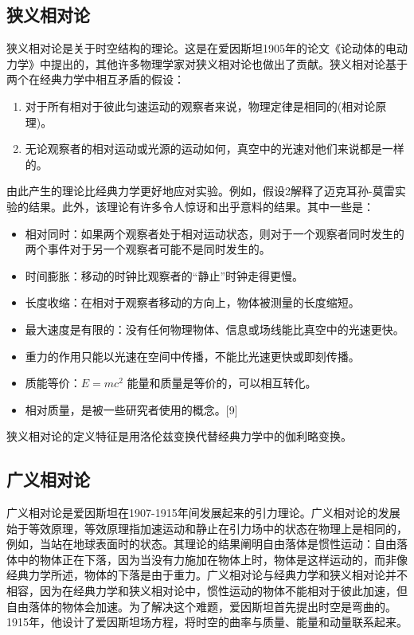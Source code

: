 \subsection{狭义相对论}

狭义相对论是关于时空结构的理论。这是在爱因斯坦1905年的论文《论动体的电动力学》中提出的，其他许多物理学家对狭义相对论也做出了贡献。狭义相对论基于两个在经典力学中相互矛盾的假设：

\begin{enumerate}
\item 对于所有相对于彼此匀速运动的观察者来说，物理定律是相同的(相对论原理)。
\item 无论观察者的相对运动或光源的运动如何，真空中的光速对他们来说都是一样的。
\end{enumerate}

由此产生的理论比经典力学更好地应对实验。例如，假设2解释了迈克耳孙-莫雷实验的结果。此外，该理论有许多令人惊讶和出乎意料的结果。其中一些是：

\begin{itemize}
\item 相对同时：如果两个观察者处于相对运动状态，则对于一个观察者同时发生的两个事件对于另一个观察者可能不是同时发生的。
\item 时间膨胀：移动的时钟比观察者的“静止”时钟走得更慢。
\item 长度收缩：在相对于观察者移动的方向上，物体被测量的长度缩短。
\item 最大速度是有限的：没有任何物理物体、信息或场线能比真空中的光速更快。
\item 重力的作用只能以光速在空间中传播，不能比光速更快或即刻传播。
\item 质能等价：$E = mc^2$ 能量和质量是等价的，可以相互转化。
\item 相对质量，是被一些研究者使用的概念。[9]
\end{itemize}

狭义相对论的定义特征是用洛伦兹变换代替经典力学中的伽利略变换。

\subsection{广义相对论}

广义相对论是爱因斯坦在1907-1915年间发展起来的引力理论。广义相对论的发展始于等效原理，等效原理指加速运动和静止在引力场中的状态在物理上是相同的，例如，当站在地球表面时的状态。其理论的结果阐明自由落体是惯性运动：自由落体中的物体正在下落，因为当没有力施加在物体上时，物体是这样运动的，而非像经典力学所述，物体的下落是由于重力。广义相对论与经典力学和狭义相对论并不相容，因为在经典力学和狭义相对论中，惯性运动的物体不能相对于彼此加速，但自由落体的物体会加速。为了解决这个难题，爱因斯坦首先提出时空是弯曲的。1915年，他设计了爱因斯坦场方程，将时空的曲率与质量、能量和动量联系起来。

